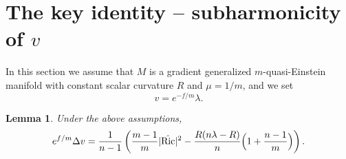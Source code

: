 \documentclass[12pt,a4paper]{article}
\newcommand{\Ric}{\operatorname{Ric}}
\newtheorem{lemma}[theorem]{Lemma}
\theoremstyle{definition}
\theoremstyle{definition}
\begin{document}
\section{The key identity – subharmonicity of $v$}
\label{sec:key}

In this section we assume that $M$ is a gradient generalized $m$-quasi-Einstein manifold with constant scalar curvature $R$ and $\mu=1/m$, and we set
\[
v = e^{-f/m}\lambda.
\]

\begin{lemma}\label{lem:key}
Under the above assumptions,
\begin{equation}
e^{f/m}\Delta v = \frac{1}{n-1}\left(\frac{m-1}{m}|\hat{\Ric}|^2
- \frac{R(n\lambda-R)}{n}\Bigl(1+\frac{n-1}{m}\Bigr)\right). \label{eq:key}
\end{equation}
\end{lemma}
\end{document}
